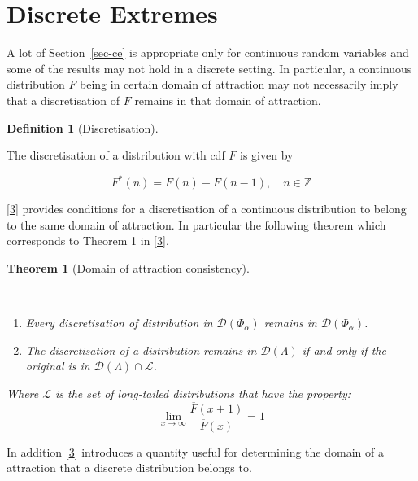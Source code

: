 \documentclass[
  10pt,
  a4paper,
]{scrreprt}
\providecommand{\tightlist}{%
  \setlength{\itemsep}{0pt}\setlength{\parskip}{0pt}}\usepackage{longtable,booktabs,array}
\theoremstyle{definition}
\newtheorem{definition}{Definition}[section]
\theoremstyle{plain}
\theoremstyle{plain}
\newtheorem{theorem}{Theorem}[section]
\theoremstyle{plain}
\theoremstyle{remark}
\begin{document}
{\hypertarget{sec-disc}{%
\section{Discrete Extremes}\label{sec-disc}}

A lot of Section~\ref{sec-ce} is appropriate only for continuous random
variables and some of the results may not hold in a discrete setting. In
particular, a continuous distribution \(F\) being in certain domain of
attraction may not necessarily imply that a discretisation of \(F\)
remains in that domain of attraction.

\begin{definition}[Discretisation]\protect\hypertarget{def-disc}{}\label{def-disc}

The discretisation of a distribution with cdf \(F\) is given by

\[F^*(n) = F(n) - F(n-1), \quad n   \in \mathbb Z\]

\end{definition}

{[}\protect\hyperlink{ref-shimura12}{3}{]} provides conditions for a
discretisation of a continuous distribution to belong to the same domain
of attraction. In particular the following theorem which corresponds to
Theorem 1 in {[}\protect\hyperlink{ref-shimura12}{3}{]}.

\begin{theorem}[Domain of attraction
consistency]\protect\hypertarget{thm-shimura1}{}\label{thm-shimura1}

~

\begin{enumerate}
\def\labelenumi{(\alph{enumi})}
\tightlist
\item
  Every discretisation of distribution in \(\mathcal D(\Phi_\alpha)\)
  remains in \(\mathcal D(\Phi_\alpha)\).
\item
  The discretisation of a distribution remains in
  \(\mathcal D(\Lambda)\) if and only if the original is in
  \(\mathcal D(\Lambda)\cap \mathcal L\).
\end{enumerate}

Where \(\mathcal L\) is the set of long-tailed distributions that have
the property: \[
\lim_{x\rightarrow \infty}\displaystyle\frac{\overline F(x+1)}{\overline F(x)} = 1   
\]

\end{theorem}

In addition {[}\protect\hyperlink{ref-shimura12}{3}{]} introduces a
quantity useful for determining the domain of a attraction that a
discrete distribution belongs to.

}
\end{document}
